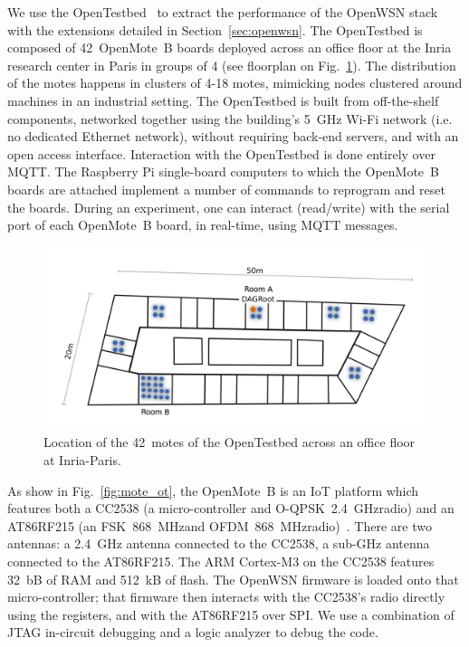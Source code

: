 \documentclass[sensors,article,submit,moreauthors,pdftex]{Definitions/mdpi}
\newcommand{\fsk}           {FSK~868~MHz}
\newcommand{\oqpsk}         {O-QPSK~2.4~GHz}
\newcommand{\ofdm}          {OFDM~868~MHz}
\newcommand{\figwidth}      {0.80}
\begin{document}
We use the OpenTestbed~\cite{munoz19opentestbed} to extract the performance of the OpenWSN stack with the extensions detailed in Section~\ref{sec:openwsn}.
The OpenTestbed is composed of 42~OpenMote~B boards deployed across an office floor at the Inria research center in Paris in groups of 4 (see floorplan on Fig.~\ref{fig:building_motes}).
The distribution of the motes happens in clusters of 4-18 motes, mimicking nodes clustered around machines in an industrial setting.
The OpenTestbed is built from off-the-shelf components,
    networked together using the building's 5~GHz Wi-Fi network (i.e. no dedicated Ethernet network),
    without requiring back-end servers, and
    with an open access interface.
Interaction with the OpenTestbed is done entirely over MQTT.
The Raspberry Pi single-board computers to which the OpenMote~B boards are attached implement a number of commands to reprogram and reset the boards.
During an experiment, one can interact (read/write) with the serial port of each OpenMote~B board, in real-time, using MQTT messages.

\begin{figure}
	\centering
	\includegraphics[width=\figwidth\columnwidth]{building_motes}
	\caption{Location of the 42~motes of the OpenTestbed across an office floor at Inria-Paris.}
    \label{fig:building_motes}
\end{figure}


As show in Fig.~\ref{fig:mote_ot}, the OpenMote~B is an IoT platform which features both
    a CC2538 (a micro-controller and \oqpsk radio) and
    an AT86RF215 (an \fsk and \ofdm radio)~\cite{tuset16openmote}.
There are two antennas:
    a 2.4~GHz antenna connected to the CC2538,
    a sub-GHz antenna connected to the AT86RF215.
The ARM Cortex-M3 on the CC2538 features 32~bB of RAM and 512~kB of flash.
The OpenWSN firmware is loaded onto that micro-controller;
    that firmware then interacts with the CC2538's radio directly using the registers,
    and with the AT86RF215 over SPI.
We use a combination of JTAG in-circuit debugging and a logic analyzer to debug the code.
\end{document}
